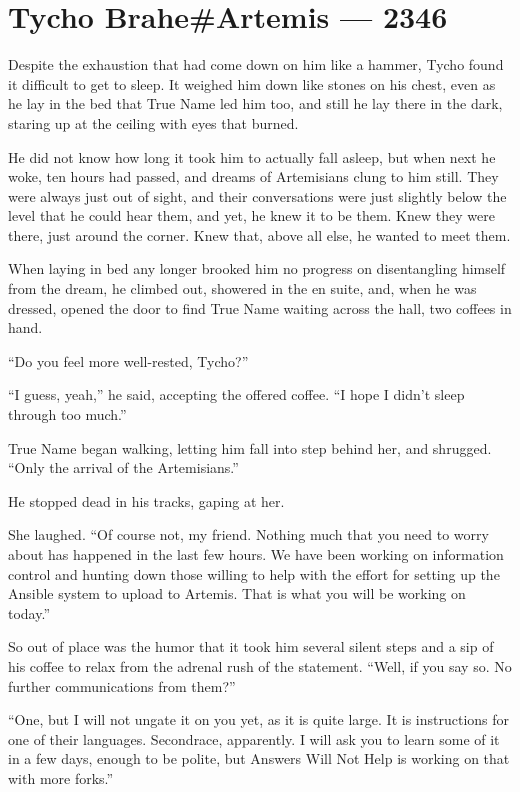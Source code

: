 \hypertarget{tycho-braheartemis-2346}{%
\chapter{Tycho Brahe\#Artemis — 2346}\label{tycho-braheartemis-2346}}

Despite the exhaustion that had come down on him like a hammer, Tycho found it difficult to get to sleep. It weighed him down like stones on his chest, even as he lay in the bed that True Name led him too, and still he lay there in the dark, staring up at the ceiling with eyes that burned.

He did not know how long it took him to actually fall asleep, but when next he woke, ten hours had passed, and dreams of Artemisians clung to him still. They were always just out of sight, and their conversations were just slightly below the level that he could hear them, and yet, he knew it to be them. Knew they were there, just around the corner. Knew that, above all else, he wanted to meet them.

When laying in bed any longer brooked him no progress on disentangling himself from the dream, he climbed out, showered in the en suite, and, when he was dressed, opened the door to find True Name waiting across the hall, two coffees in hand.

``Do you feel more well-rested, Tycho?''

``I guess, yeah,'' he said, accepting the offered coffee. ``I hope I didn't sleep through too much.''

True Name began walking, letting him fall into step behind her, and shrugged. ``Only the arrival of the Artemisians.''

He stopped dead in his tracks, gaping at her.

She laughed. ``Of course not, my friend. Nothing much that you need to worry about has happened in the last few hours. We have been working on information control and hunting down those willing to help with the effort for setting up the Ansible system to upload to Artemis. That is what you will be working on today.''

So out of place was the humor that it took him several silent steps and a sip of his coffee to relax from the adrenal rush of the statement. ``Well, if you say so. No further communications from them?''

``One, but I will not ungate it on you yet, as it is quite large. It is instructions for one of their languages. Secondrace, apparently. I will ask you to learn some of it in a few days, enough to be polite, but Answers Will Not Help is working on that with more forks.''

